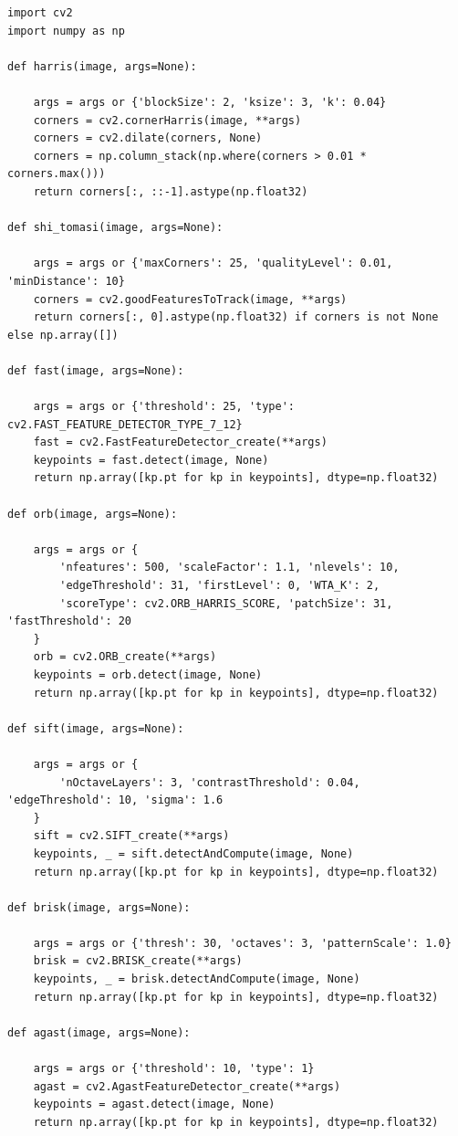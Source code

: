 \documentclass[journal]{IEEEtran}
\begin{document}
\begin{lstlisting}[style=python, caption={All Corner Detection Wrappers}, label={lst:corner_methods}]
import cv2
import numpy as np

def harris(image, args=None):

    args = args or {'blockSize': 2, 'ksize': 3, 'k': 0.04}
    corners = cv2.cornerHarris(image, **args)
    corners = cv2.dilate(corners, None)
    corners = np.column_stack(np.where(corners > 0.01 * corners.max()))
    return corners[:, ::-1].astype(np.float32)

def shi_tomasi(image, args=None):

    args = args or {'maxCorners': 25, 'qualityLevel': 0.01, 'minDistance': 10}
    corners = cv2.goodFeaturesToTrack(image, **args)
    return corners[:, 0].astype(np.float32) if corners is not None else np.array([])

def fast(image, args=None):

    args = args or {'threshold': 25, 'type': cv2.FAST_FEATURE_DETECTOR_TYPE_7_12}
    fast = cv2.FastFeatureDetector_create(**args)
    keypoints = fast.detect(image, None)
    return np.array([kp.pt for kp in keypoints], dtype=np.float32)

def orb(image, args=None):

    args = args or {
        'nfeatures': 500, 'scaleFactor': 1.1, 'nlevels': 10,
        'edgeThreshold': 31, 'firstLevel': 0, 'WTA_K': 2,
        'scoreType': cv2.ORB_HARRIS_SCORE, 'patchSize': 31, 'fastThreshold': 20
    }
    orb = cv2.ORB_create(**args)
    keypoints = orb.detect(image, None)
    return np.array([kp.pt for kp in keypoints], dtype=np.float32)

def sift(image, args=None):

    args = args or {
        'nOctaveLayers': 3, 'contrastThreshold': 0.04, 'edgeThreshold': 10, 'sigma': 1.6
    }
    sift = cv2.SIFT_create(**args)
    keypoints, _ = sift.detectAndCompute(image, None)
    return np.array([kp.pt for kp in keypoints], dtype=np.float32)

def brisk(image, args=None):

    args = args or {'thresh': 30, 'octaves': 3, 'patternScale': 1.0}
    brisk = cv2.BRISK_create(**args)
    keypoints, _ = brisk.detectAndCompute(image, None)
    return np.array([kp.pt for kp in keypoints], dtype=np.float32)

def agast(image, args=None):

    args = args or {'threshold': 10, 'type': 1}
    agast = cv2.AgastFeatureDetector_create(**args)
    keypoints = agast.detect(image, None)
    return np.array([kp.pt for kp in keypoints], dtype=np.float32)


\end{lstlisting}
\end{document}
